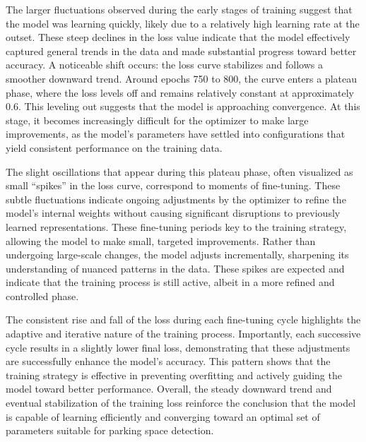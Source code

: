 \documentclass[conference]{IEEEtran}
\begin{document}
The larger fluctuations observed during the early stages of training suggest that the model was learning quickly, likely due to a relatively high learning rate at the outset. These steep declines in the loss value indicate that the model effectively captured general trends in the data and made substantial progress toward better accuracy. A noticeable shift occurs: the loss curve stabilizes and follows a smoother downward trend. Around epochs 750 to 800, the curve enters a plateau phase, where the loss levels off and remains relatively constant at approximately 0.6. This leveling out suggests that the model is approaching convergence. At this stage, it becomes increasingly difficult for the optimizer to make large improvements, as the model’s parameters have settled into configurations that yield consistent performance on the training data.

The slight oscillations that appear during this plateau phase, often visualized as small “spikes” in the loss curve, correspond to moments of fine-tuning. These subtle fluctuations indicate ongoing adjustments by the optimizer to refine the model’s internal weights without causing significant disruptions to previously learned representations. These fine-tuning periods key to the training strategy, allowing the model to make small, targeted improvements. Rather than undergoing large-scale changes, the model adjusts incrementally, sharpening its understanding of nuanced patterns in the data. These spikes are expected and indicate that the training process is still active, albeit in a more refined and controlled phase.

The consistent rise and fall of the loss during each fine-tuning cycle highlights the adaptive and iterative nature of the training process. Importantly, each successive cycle results in a slightly lower final loss, demonstrating that these adjustments are successfully enhance the model’s accuracy. This pattern shows that the training strategy is effective in preventing overfitting and actively guiding the model toward better performance. Overall, the steady downward trend and eventual stabilization of the training loss reinforce the conclusion that the model is capable of learning efficiently and converging toward an optimal set of parameters suitable for parking space detection.
\end{document}

